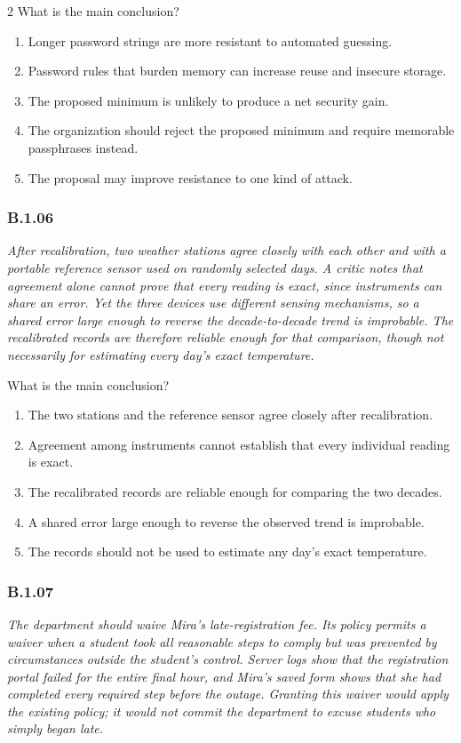 \documentclass[10pt]{extarticle}
\newcommand{\choice}[1]{\item #1}
\newcommand{\bankitem}[1]{\subsubsection*{#1}}
\begin{document}
\begin{multicols}{2}
What is the main conclusion?
\begin{enumerate}[label=(\alph*)]
  \choice{Longer password strings are more resistant to automated guessing.}
  \choice{Password rules that burden memory can increase reuse and insecure storage.}
  \choice{The proposed minimum is unlikely to produce a net security gain.}
  \choice{The organization should reject the proposed minimum and require memorable passphrases instead.}
  \choice{The proposal may improve resistance to one kind of attack.}
\end{enumerate}
\bankitem{B.1.06}
\emph{After recalibration, two weather stations agree closely with each other and with a portable reference sensor used on randomly selected days. A critic notes that agreement alone cannot prove that every reading is exact, since instruments can share an error. Yet the three devices use different sensing mechanisms, so a shared error large enough to reverse the decade-to-decade trend is improbable. The recalibrated records are therefore reliable enough for that comparison, though not necessarily for estimating every day's exact temperature.}

What is the main conclusion?
\begin{enumerate}[label=(\alph*)]
  \choice{The two stations and the reference sensor agree closely after recalibration.}
  \choice{Agreement among instruments cannot establish that every individual reading is exact.}
  \choice{The recalibrated records are reliable enough for comparing the two decades.}
  \choice{A shared error large enough to reverse the observed trend is improbable.}
  \choice{The records should not be used to estimate any day's exact temperature.}
\end{enumerate}
\bankitem{B.1.07}
\emph{The department should waive Mira's late-registration fee. Its policy permits a waiver when a student took all reasonable steps to comply but was prevented by circumstances outside the student's control. Server logs show that the registration portal failed for the entire final hour, and Mira's saved form shows that she had completed every required step before the outage. Granting this waiver would apply the existing policy; it would not commit the department to excuse students who simply began late.}


\end{multicols}
\end{document}
